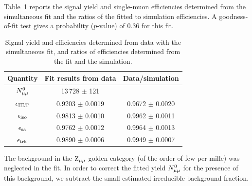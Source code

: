 Table~\ref{fig:fitRes_36pb} reports the signal yield and single-muon efficiencies determined from
the simultaneous fit and the ratios of the fitted to simulation efficiencies.
A goodness-of-fit test gives a probability ($p$-value) of 0.36 for this fit.


\begin{table}[htbp] %
\begin{center}
\caption{Signal yield and efficiencies determined from data with the simultaneous fit, and
  ratios of efficiencies determined from the fit and the simulation.}
\label{fig:fitRes_36pb}
\begin{tabular}{|c|c|c|}
\hline
Quantity & Fit results from data & Data/simulation\\
\hline\hline
$N^0_{\mu\mu}$ &13\,728 $\pm$ 121   & \\
\hline
$\epsilon_\mathrm{HLT}$ & 0.9203 $\pm$ 0.0019  &0.9672 $\pm$ 0.0020   \\
$\epsilon_\mathrm{iso}$ & 0.9813 $\pm$ 0.0010& 0.9962 $\pm$  0.0011 \\
$\epsilon_\mathrm{sa}$ & 0.9762  $\pm$ 0.0012 & 0.9964 $\pm$ 0.0013 \\
$\epsilon_\mathrm{trk}$ & 0.9890 $\pm$ 0.0006  & 0.9949 $\pm$ 0.0007  \\
\hline
\end{tabular}
\end{center}
\end{table}


The background in the $\mathrm{Z}_{\mu\mu}$ golden category (of the order of few per mille)
was neglected in the fit. In order to correct the fitted yield $N^0_{\mu\mu}$ for
the presence of this background, we subtract the small estimated irreducible
background fraction.

